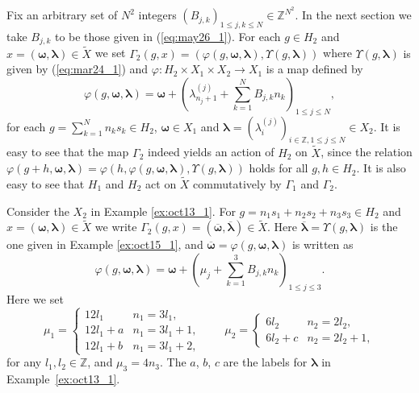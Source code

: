 \documentclass[11pt]{article}
\newcommand{\Z}{{\mathbb Z}}
\newcommand\bom{\boldsymbol{\omega}}
\newcommand\bol{\boldsymbol{\lambda}}
\begin{document}
Fix an arbitrary set of $N^2$ integers $(B_{j,k})_{1 \leq j,k \leq N} \in \Z^{N^2}$.
In the next section we take $B_{j,k}$ to be those given in (\ref{eq:may26_1}).
For each $g \in H_2$ and $x =(\bom,\bol) \in \tilde{X}$
we set
$\varGamma_2(g, x) = (\varphi (g, \bom, \bol), \Upsilon (g,\bol))$ where
{$\Upsilon (g,\bol)$ is given by (\ref{eq:mar24_1}) and
$\varphi : H_2 \times X_1 \times X_2 \rightarrow X_1$ is a map def\/ined by
\begin{equation}\label{eq:oct19_2}
\varphi (g, \bom, \bol) = \bom +
\left(  \lambda^{(j)}_{n_j+1} + \sum_{k=1}^N B_{j,k} n_k \right)_{1 \leq j \leq N},
\end{equation}
for each $g = \sum_{k=1}^N n_k s_k \in H_2$,
$\bom \in X_1$ and
$\bol = (\lambda^{(j)}_i)_{i \in \Z, 1 \leq j \leq N} \in X_2$.}
It is easy to see that
the map $\varGamma_2$ indeed yields an action of $H_2$ on $\tilde{X}$, since
the relation $\varphi (g + h, \bom, \bol) =
\varphi (h, \varphi(g, \bom, \bol) , \Upsilon (g,\bol))$ holds for all $g,h \in H_2$.
It is also easy to see that
$H_1$ and $H_2$ act on $\tilde{X}$ commutatively by $\varGamma_1$ and $\varGamma_2$.
%
\begin{example}\label{ex:oct15_3}
Consider the $X_2$ in Example \ref{ex:oct13_1}.
%
For $g = n_1 s_1 + n_2 s_2 + n_3 s_3 \in H_2$ and
$x =(\bom,\bol) \in \tilde{X}$
we write $\varGamma_2(g, x) =(\overline{\bom}, \overline{\bol}) \in \tilde{X}$.
Here $\overline{\bol} = \Upsilon (g , \bol)$ is the one given in Example \ref{ex:oct15_1}, and
$\overline{\bom} = \varphi (g, \bom, \bol)$ is written as
\begin{displaymath}
\varphi (g, \bom, \bol) = \bom +
\left( \mu_j + \sum_{k=1}^3 B_{j,k} n_k \right) _{1 \leq j \leq 3}.
\end{displaymath}
Here we set
\begin{equation*}
\mu_1 =
\begin{cases}
12 l_1 & n_1 = 3 l_1,\\
12 l_1 + a & n_1 = 3 l_1+1,\\
12 l_1 + b & n_1 = 3 l_1+2,
\end{cases}
\qquad
\mu_2 =
\begin{cases}
6 l_2 & n_2 = 2 l_2,\\
6 l_2 + c & n_2 = 2 l_2 + 1,
\end{cases}
\end{equation*}
for any $l_1, l_2 \in \Z$, and $\mu_3 = 4 n_3$.
The $a$, $b$, $c$ are the labels for $\bol$ in Example~\ref{ex:oct13_1}.
\end{example}
\end{document}
